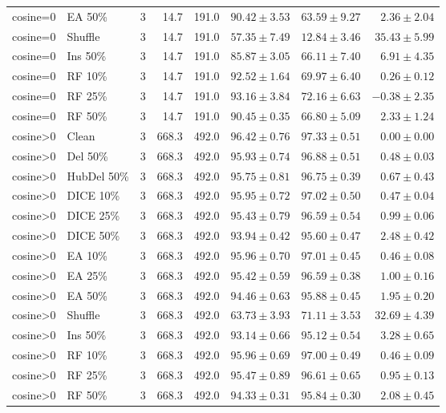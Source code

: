 {\begin{longtable}{llrrrrrr}
cosine=0 & EA 50\% & 3 & 14.7 & 191.0 & $90.42\pm3.53$ & $63.59\pm9.27$ & $2.36\pm2.04$ \\
cosine=0 & Shuffle & 3 & 14.7 & 191.0 & $57.35\pm7.49$ & $12.84\pm3.46$ & $35.43\pm5.99$ \\
cosine=0 & Ins 50\% & 3 & 14.7 & 191.0 & $85.87\pm3.05$ & $66.11\pm7.40$ & $6.91\pm4.35$ \\
cosine=0 & RF 10\% & 3 & 14.7 & 191.0 & $92.52\pm1.64$ & $69.97\pm6.40$ & $0.26\pm0.12$ \\
cosine=0 & RF 25\% & 3 & 14.7 & 191.0 & $93.16\pm3.84$ & $72.16\pm6.63$ & $-0.38\pm2.35$ \\
cosine=0 & RF 50\% & 3 & 14.7 & 191.0 & $90.45\pm0.35$ & $66.80\pm5.09$ & $2.33\pm1.24$ \\
cosine>0 & Clean & 3 & 668.3 & 492.0 & $96.42\pm0.76$ & $97.33\pm0.51$ & $0.00\pm0.00$ \\
cosine>0 & Del 50\% & 3 & 668.3 & 492.0 & $95.93\pm0.74$ & $96.88\pm0.51$ & $0.48\pm0.03$ \\
cosine>0 & HubDel 50\% & 3 & 668.3 & 492.0 & $95.75\pm0.81$ & $96.75\pm0.39$ & $0.67\pm0.43$ \\
cosine>0 & DICE 10\% & 3 & 668.3 & 492.0 & $95.95\pm0.72$ & $97.02\pm0.50$ & $0.47\pm0.04$ \\
cosine>0 & DICE 25\% & 3 & 668.3 & 492.0 & $95.43\pm0.79$ & $96.59\pm0.54$ & $0.99\pm0.06$ \\
cosine>0 & DICE 50\% & 3 & 668.3 & 492.0 & $93.94\pm0.42$ & $95.60\pm0.47$ & $2.48\pm0.42$ \\
cosine>0 & EA 10\% & 3 & 668.3 & 492.0 & $95.96\pm0.70$ & $97.01\pm0.45$ & $0.46\pm0.08$ \\
cosine>0 & EA 25\% & 3 & 668.3 & 492.0 & $95.42\pm0.59$ & $96.59\pm0.38$ & $1.00\pm0.16$ \\
cosine>0 & EA 50\% & 3 & 668.3 & 492.0 & $94.46\pm0.63$ & $95.88\pm0.45$ & $1.95\pm0.20$ \\
cosine>0 & Shuffle & 3 & 668.3 & 492.0 & $63.73\pm3.93$ & $71.11\pm3.53$ & $32.69\pm4.39$ \\
cosine>0 & Ins 50\% & 3 & 668.3 & 492.0 & $93.14\pm0.66$ & $95.12\pm0.54$ & $3.28\pm0.65$ \\
cosine>0 & RF 10\% & 3 & 668.3 & 492.0 & $95.96\pm0.69$ & $97.00\pm0.49$ & $0.46\pm0.09$ \\
cosine>0 & RF 25\% & 3 & 668.3 & 492.0 & $95.47\pm0.89$ & $96.61\pm0.65$ & $0.95\pm0.13$ \\
cosine>0 & RF 50\% & 3 & 668.3 & 492.0 & $94.33\pm0.31$ & $95.84\pm0.30$ & $2.08\pm0.45$ \\

\end{longtable}}

